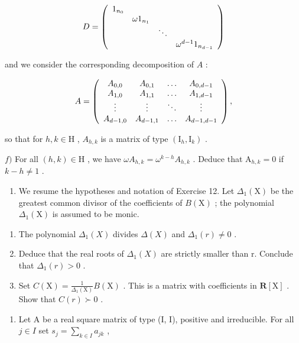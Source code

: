 \[
D = \left( \begin{array}{c c c c} 1 _ {n _ {0}} & & & \\ & \omega 1 _ {n _ {1}} & & \\ & & \ddots & \\ & & & \omega^ {d - 1} 1 _ {n _ {d - 1}} \end{array} \right)
\]

and we consider the corresponding decomposition of \(A\) :

\[
A = \left( \begin{array}{c c c c} A _ {0, 0} & A _ {0, 1} & \dots & A _ {0, d - 1} \\ A _ {1, 0} & A _ {1, 1} & \dots & A _ {1, d - 1} \\ \vdots & \vdots & \ddots & \vdots \\ A _ {d - 1, 0} & A _ {d - 1, 1} & \dots & A _ {d - 1, d - 1} \end{array} \right),
\]

so that for \(h, k \in \mathrm{H}\) , \(A_{h,k}\) is a matrix of type \((\mathrm{I}_h, \mathrm{I}_k)\) .

\(f)\) For all \((h,k)\in\mathrm{H}\) , we have \(\omega A_{h,k}=\omega^{k-h}A_{h,k}\) . Deduce that \(\mathrm{A}_{h,k}=0\) if \(k-h\neq1\) .

\begin{enumerate}
\def\labelenumi{\arabic{enumi})}
\setcounter{enumi}{14}
\tightlist
\item
  We resume the hypotheses and notation of Exercise 12. Let \(\Delta_1(\mathrm{X})\) be the greatest common divisor of the coefficients of \(B(\mathrm{X})\) ; the polynomial \(\Delta_1(\mathrm{X})\) is assumed to be monic.
\end{enumerate}

\begin{enumerate}
\def\labelenumi{\alph{enumi})}
\item
  The polynomial \(\Delta_1(X)\) divides \(\Delta(X)\) and \(\Delta_1(r) \neq 0\) .
\item
  Deduce that the real roots of \(\Delta_{1}(X)\) are strictly smaller than r. Conclude that \(\Delta_{1}(r)>0\) .
\item
  Set \(C(\mathrm{X}) = \frac{1}{\Delta_1(\mathrm{X})} B(\mathrm{X})\) . This is a matrix with coefficients in \(\mathbf{R}[\mathrm{X}]\) . Show that \(C(r) \succ 0\) .
\end{enumerate}

\begin{enumerate}
\def\labelenumi{\arabic{enumi})}
\setcounter{enumi}{15}
\tightlist
\item
  Let A be a real square matrix of type (I, I), positive and irreducible. For all \(j \in I\) set \(s_{j} = \sum_{k \in I} a_{jk}\) ,
\end{enumerate}

